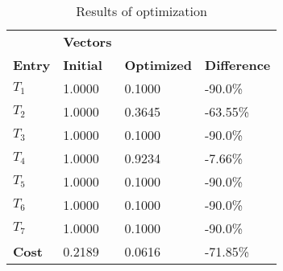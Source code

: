 \begin{table}[H]
\centering
\begin{tabular}{llll}
\textbf{}      & \cellcolor[HTML]{EFEFEF}\textbf{Vectors} & \textbf{} & \textbf{}         \\
\rowcolor[HTML]{EFEFEF} 
\textbf{Entry} & \textbf{Initial} & \textbf{Optimized} & \textbf{Difference} \\
$T_1$ & 1.0000 & 0.1000 & -90.0\% \\ 
$T_2$ & 1.0000 & 0.3645 & -63.55\% \\ 
$T_3$ & 1.0000 & 0.1000 & -90.0\% \\ 
$T_4$ & 1.0000 & 0.9234 & -7.66\% \\ 
$T_5$ & 1.0000 & 0.1000 & -90.0\% \\ 
$T_6$ & 1.0000 & 0.1000 & -90.0\% \\ 
$T_7$ & 1.0000 & 0.1000 & -90.0\% \\ 
\rowcolor[HTML]{EFEFEF} 
\textbf{Cost}  & 0.2189 & 0.0616 & -71.85\% \\ 
\end{tabular}
\caption{Results of optimization}
\label{tab:OptimizationAnalysis}
\end{table}